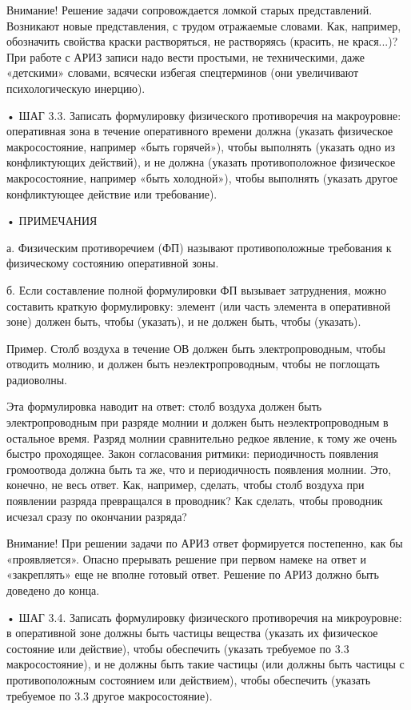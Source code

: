 Внимание! Решение  задачи сопровождается ломкой  старых представлений.
Возникают  новые  представления,  с трудом  отражаемые  словами.  Как,
например,  обозначить  свойства  краски растворяться,  не  растворяясь
(красить,  не  крася...)?   При  работе  с  АРИЗ   записи  надо  вести
простыми, не  техническими, даже «детскими» словами,  всячески избегая
спецтерминов (они увеличивают психологическую инерцию).


•  ШАГ   3.3.  Записать   формулировку  физического   противоречия  на
макроуровне: оперативная  зона в  течение оперативного  времени должна
(указать  физическое макросостояние,  например «быть  горячей»), чтобы
выполнять  (указать  одно  из  конфликтующих действий),  и  не  должна
(указать  противоположное  физическое макросостояние,  например  «быть
холодной»), чтобы выполнять (указать другое конфликтующее действие или
требование).

• ПРИМЕЧАНИЯ

а. Физическим противоречием (ФП) называют противоположные требования к
физическому состоянию оперативной зоны.

б.  Если  составление  полной формулировки  ФП  вызывает  затруднения,
можно составить  краткую формулировку:  элемент (или часть  элемента в
оперативной  зоне) должен  быть, чтобы  (указать), и  не должен  быть,
чтобы (указать).


Пример. Столб воздуха в течение ОВ должен быть электропроводным, чтобы
отводить молнию, и должен  быть неэлектропроводным, чтобы не поглощать
радиоволны.


Эта  формулировка   наводит  на  ответ:  столб   воздуха  должен  быть
электропроводным при разряде молнии и должен быть неэлектропроводным в
остальное время. Разряд молнии сравнительно  редкое явление, к тому же
очень  быстро проходящее.  Закон  согласования ритмики:  периодичность
появления громоотвода должна быть та же, что и периодичность появления
молнии. Это,  конечно, не  весь ответ.  Как, например,  сделать, чтобы
столб  воздуха  при появлении  разряда  превращался  в проводник?  Как
сделать, чтобы проводник исчезал сразу по окончании разряда?

Внимание! При решении задачи по АРИЗ ответ формируется постепенно, как
бы «проявляется». Опасно прерывать решение  при первом намеке на ответ
и «закреплять»  еще не  вполне готовый ответ.  Решение по  АРИЗ должно
быть доведено до конца.


•  ШАГ   3.4.  Записать   формулировку  физического   противоречия  на
микроуровне: в оперативной зоне  должны быть частицы вещества (указать
их  физическое  состояние  или действие),  чтобы  обеспечить  (указать
требуемое по 3.3 макросостояние), и  не должны быть такие частицы (или
должны быть частицы с противоположным состоянием или действием), чтобы
обеспечить (указать требуемое по 3.3 другое макросостояние).

